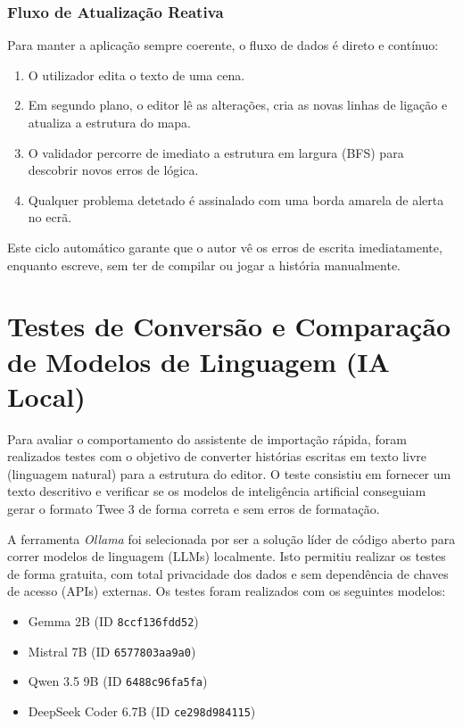 \subsubsection{Fluxo de Atualização Reativa}
Para manter a aplicação sempre coerente, o fluxo de dados é direto e contínuo:
\begin{enumerate}
    \item O utilizador edita o texto de uma cena.
    \item Em segundo plano, o editor lê as alterações, cria as novas linhas de ligação e atualiza a estrutura do mapa.
    \item O validador percorre de imediato a estrutura em largura (BFS) para descobrir novos erros de lógica.
    \item Qualquer problema detetado é assinalado com uma borda amarela de alerta no ecrã.
\end{enumerate}
Este ciclo automático garante que o autor vê os erros de escrita imediatamente, enquanto escreve, sem ter de compilar ou jogar a história manualmente.

\section{Testes de Conversão e Comparação de Modelos de Linguagem (IA Local)}

Para avaliar o comportamento do assistente de importação rápida, foram realizados testes com o objetivo de converter histórias escritas em texto livre (linguagem natural) para a estrutura do editor. O teste consistiu em fornecer um texto descritivo e verificar se os modelos de inteligência artificial conseguiam gerar o formato Twee 3 de forma correta e sem erros de formatação.

A ferramenta \textit{Ollama} foi selecionada por ser a solução líder de código aberto para correr modelos de linguagem (LLMs) localmente. Isto permitiu realizar os testes de forma gratuita, com total privacidade dos dados e sem dependência de chaves de acesso (APIs) externas. Os testes foram realizados com os seguintes modelos:
\begin{itemize}
    \item Gemma 2B (ID \texttt{8ccf136fdd52})
    \item Mistral 7B (ID \texttt{6577803aa9a0})
    \item Qwen 3.5 9B (ID \texttt{6488c96fa5fa})
    \item DeepSeek Coder 6.7B (ID \texttt{ce298d984115})
\end{itemize}

